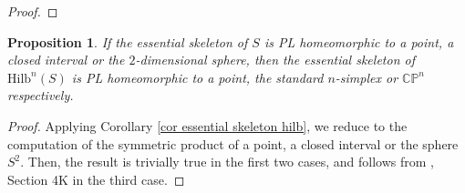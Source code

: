 \documentclass{amsart}%
\numberwithin{equation}{subsection}
\theoremstyle{plain2}
\newtheorem{prop}[equation]{Proposition}
\theoremstyle{definition2}
\theoremstyle{stepstyle}
\theoremstyle{point}
\theoremstyle{subpoint}
\newcommand{\CP}{\ensuremath{\mathbb{CP}}}
\newcommand{\Hilb}{\ensuremath{\mathrm{Hilb}}}
\begin{document}
{\begin{proof}
\end{proof}
\begin{prop} \label{prop top essential skeleton Hilb}
If the essential skeleton of $S$ is PL homeomorphic to a point, a closed interval or the $2$-dimensional sphere, then the essential skeleton of $\Hilb^n(S)$ is PL homeomorphic to a point, the standard $n$-simplex or $\CP^n$ respectively. 
\end{prop}
\begin{proof} Applying Corollary \ref{cor essential skeleton hilb}, we reduce to the computation of the symmetric product of a point, a closed interval or the sphere $S^2$. Then, the result is trivially true in the first two cases, and follows from \cite{Hatcher}, Section 4K in the third case.
\end{proof}

}
\end{document}
